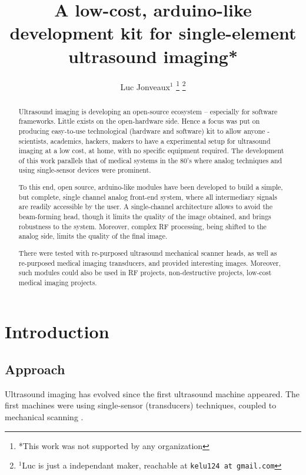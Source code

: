 \documentclass[letterpaper, 10 pt, conference]{ieeeconf} %
\title{\LARGE \bf
A low-cost, arduino-like development kit for single-element ultrasound imaging*
}
\author{Luc Jonveaux$^{1}$ %
\thanks{*This work was not supported by any organization}%
\thanks{$^{1}$Luc is just a independant maker, reachable at 
    {\tt\small kelu124 at gmail.com}%
}
}
\begin{document}
\maketitle
\thispagestyle{empty}
\pagestyle{empty}


\begin{abstract}

Ultrasound imaging is developing an open-source ecosystem – especially for software frameworks. Little exists on the open-hardware side. Hence a focus was put on producing easy-to-use technological (hardware and software) kit to allow anyone - scientists, academics, hackers, makers to have a experimental setup for ultrasound imaging at a low cost, at home, with no specific equipment required. The development of this work parallels that of medical systems in the 80’s where analog techniques and using single-sensor devices were prominent.

To this end, open source, arduino-like modules have been developed to build a simple, but complete, single channel analog front-end system, where all intermediary signals are readily accessible by the user. A single-channel architecture allows to avoid the beam-forming head, though it limits the quality of the image obtained, and brings robustness to the system. Moreover, complex RF processing, being shifted to the analog side, limits the quality of the final image.

There were tested with re-purposed ultrasound mechanical scanner heads, as well as re-purposed medical imaging transducers, and provided interesting images. Moreover, such modules could also be used in RF projects, non-destructive projects, low-cost medical imaging projects.

\end{abstract}


\section{Introduction}

\subsection{Approach}

Ultrasound imaging has evolved since the first ultrasound machine appeared. The first machines were using single-sensor (transducers) techniques, coupled to mechanical scanning \cite{IntrotoUS}. 
\end{document}

